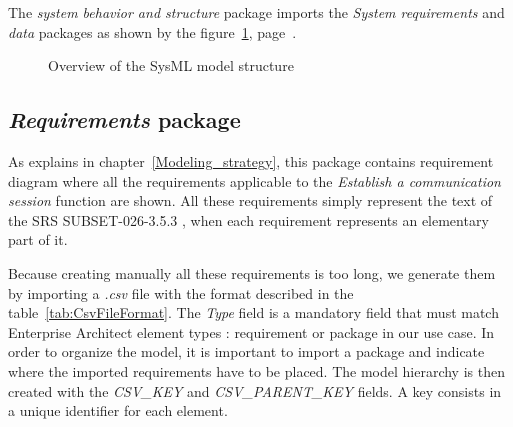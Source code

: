 \documentclass{template/openetcs_report}
\newcommand\refFigure[1]{figure~\ref{#1}, page~\pageref{#1}}
\newcommand\refChapter[1]{chapter~\ref{#1}}
\newcommand\refTable[1]{table~\ref{#1}}
\newcommand\packageName[1]{\emph{#1}}
\begin{document}
 The \packageName{system behavior and structure} package imports the \packageName{System requirements} and \packageName{data} packages as shown by the \refFigure{fig:Model_overview}.

\begin{figure}[h]
  \centering
  \caption{Overview of the SysML model structure}
  \label{fig:Model_overview}
\end{figure}

\subsection{\packageName{Requirements} package}

As explains in \refChapter{Modeling_strategy}, this package contains requirement diagram where all the requirements applicable to the \textsl{Establish a communication session} function are shown. All these requirements simply represent the text of the SRS SUBSET-026-3.5.3 \cite{SRS}, when each requirement represents an elementary part of it. 

Because creating manually all these requirements is too long, we generate them by importing a \textsl{.csv} file with the format described in the \refTable{tab:CsvFileFormat}. The \emph{Type} field is a mandatory field that must match Enterprise Architect element types : requirement or package in our use case. In order to organize the model, it is important to import a package and indicate where the imported requirements have to be placed. The model hierarchy is then created with the \emph{CSV\_KEY} and \emph{CSV\_PARENT\_KEY} fields. A key consists in a unique identifier for each element.
\end{document}
